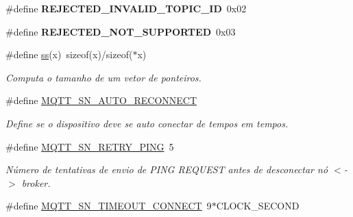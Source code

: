 \begin{DoxyCompactItemize}
\item 
\hypertarget{group__MQTT__SN__CONTROL_ga9b548f6c60530b07c9b9f5ef5b1ac8b9}{\#define {\bfseries R\+E\+J\+E\+C\+T\+E\+D\+\_\+\+I\+N\+V\+A\+L\+I\+D\+\_\+\+T\+O\+P\+I\+C\+\_\+\+I\+D}~0x02}\label{group__MQTT__SN__CONTROL_ga9b548f6c60530b07c9b9f5ef5b1ac8b9}

\item 
\hypertarget{group__MQTT__SN__CONTROL_ga93af4e6b658c4823ae9603b86bb7c64a}{\#define {\bfseries R\+E\+J\+E\+C\+T\+E\+D\+\_\+\+N\+O\+T\+\_\+\+S\+U\+P\+P\+O\+R\+T\+E\+D}~0x03}\label{group__MQTT__SN__CONTROL_ga93af4e6b658c4823ae9603b86bb7c64a}

\item 
\hypertarget{group__MQTT__SN__CONTROL_ga34bf6ae7cc029057c70910ae26a3335f}{\#define \hyperlink{group__MQTT__SN__CONTROL_ga34bf6ae7cc029057c70910ae26a3335f}{ss}(x)~sizeof(x)/sizeof($\ast$x)}\label{group__MQTT__SN__CONTROL_ga34bf6ae7cc029057c70910ae26a3335f}

\begin{DoxyCompactList}\small\item\em Computa o tamanho de um vetor de ponteiros. \end{DoxyCompactList}\item 
\hypertarget{group__MQTT__SN__CONTROL_ga8d316cee94174b8c2d16e328fdf1e607}{\#define \hyperlink{group__MQTT__SN__CONTROL_ga8d316cee94174b8c2d16e328fdf1e607}{M\+Q\+T\+T\+\_\+\+S\+N\+\_\+\+A\+U\+T\+O\+\_\+\+R\+E\+C\+O\+N\+N\+E\+C\+T}}\label{group__MQTT__SN__CONTROL_ga8d316cee94174b8c2d16e328fdf1e607}

\begin{DoxyCompactList}\small\item\em Define se o dispositivo deve se auto conectar de tempos em tempos. \end{DoxyCompactList}\item 
\hypertarget{group__MQTT__SN__CONTROL_ga180af20d177732dc470c147452feb30f}{\#define \hyperlink{group__MQTT__SN__CONTROL_ga180af20d177732dc470c147452feb30f}{M\+Q\+T\+T\+\_\+\+S\+N\+\_\+\+R\+E\+T\+R\+Y\+\_\+\+P\+I\+N\+G}~5}\label{group__MQTT__SN__CONTROL_ga180af20d177732dc470c147452feb30f}

\begin{DoxyCompactList}\small\item\em Número de tentativas de envio de P\+I\+N\+G R\+E\+Q\+U\+E\+S\+T antes de desconectar nó $<$-\/$>$ broker. \end{DoxyCompactList}\item 
\hypertarget{group__MQTT__SN__CONTROL_ga7533efb537d4d4eebf1b6d3d5256cb0b}{\#define \hyperlink{group__MQTT__SN__CONTROL_ga7533efb537d4d4eebf1b6d3d5256cb0b}{M\+Q\+T\+T\+\_\+\+S\+N\+\_\+\+T\+I\+M\+E\+O\+U\+T\+\_\+\+C\+O\+N\+N\+E\+C\+T}~9$\ast$C\+L\+O\+C\+K\+\_\+\+S\+E\+C\+O\+N\+D}\label{group__MQTT__SN__CONTROL_ga7533efb537d4d4eebf1b6d3d5256cb0b}


\end{DoxyCompactItemize}
